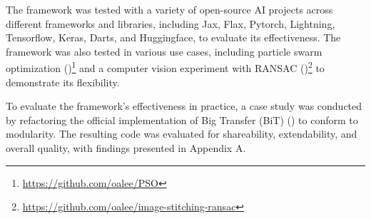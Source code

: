 The framework was tested with a variety of open-source AI projects across different frameworks and libraries, including Jax, Flax, Pytorch, Lightning, Tensorflow, Keras, Darts, and Huggingface, to evaluate its effectiveness. The framework was also tested in various use cases, including particle swarm optimization (\cite{kennedy1995particle})\footnote{\url{https://github.com/oalee/PSO}} and a computer vision experiment with RANSAC (\cite{lowe2004distinctive})\footnote{\url{https://github.com/oalee/image-stitching-ransac}} to demonstrate its flexibility.

To evaluate the framework's effectiveness in practice, a case study was conducted by refactoring the official implementation of Big Transfer (BiT) (\cite{transferlearning}) to conform to modularity. The resulting code was evaluated for shareability, extendability, and overall quality, with findings presented in Appendix A.




